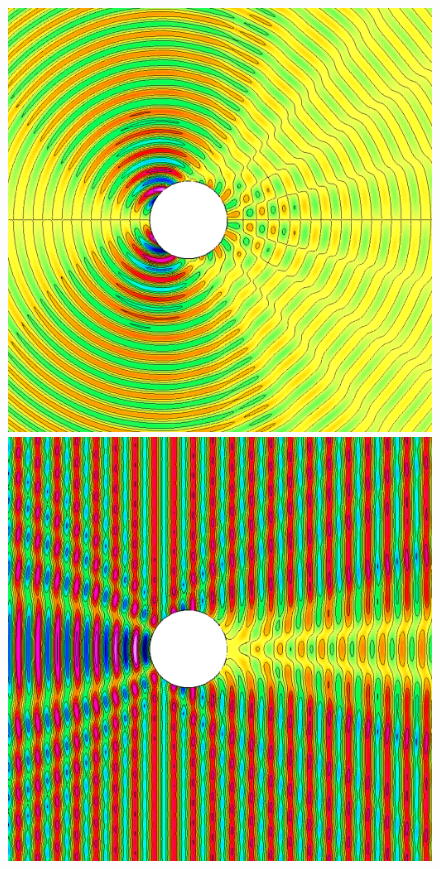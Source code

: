 \begin{figure}
\begin{center}
\includegraphics[width=\figWidth]{figures/scatCyl-cibc2-order4-k4-ExTotal}
\includegraphics[width=\figWidth]{figures/scatCyl-cibc2-order4-k4-EyTotal}

\end{center}
\end{figure}
